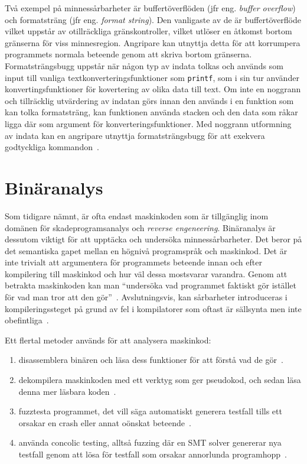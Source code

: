 Två exempel på minnessårbarheter är buffertöverflöden (jfr eng. \emph{buffer
    overflow}) och formatsträng (jfr eng. \emph{format string}). Den
vanligaste av de är buffertöverflöde vilket uppstår av otillräckliga
gränskontroller, vilket utlöser en åtkomst bortom gränserna för viss
minnesregion. Angripare kan utnyttja detta för att korrumpera programmets
normala beteende genom att skriva bortom gränserna. Formatsträngsbugg uppstår
när någon typ av indata tolkas och används som input till vanliga
textkonverteringsfunktioner som \texttt{printf}, som i sin tur använder
konvertingsfunktioner för kovertering av olika data till text. Om inte en
noggrann och tillräcklig utvärdering av indatan görs innan den används i en
funktion som kan tolka formatsträng, kan funktionen använda stacken och den
data som råkar ligga där som argument för konverteringsfunktioner. Med noggrann
utformning av indata kan en angripare utnyttja formatsträngsbugg för att
exekvera godtyckliga kommandon~\cite{computer_security_cs161}.


\section{Binäranalys}
\label{sec:binar_analys}
Som tidigare nämnt, är ofta endast maskinkoden som är tillgänglig inom domänen
för skadeprogramsanalys och \emph{reverse engeneering}. Binäranalys är dessutom
viktigt för att upptäcka och undersöka minnessårbarheter. Det beror på det
semantiska gapet mellan en högnivå programspråk och maskinkod. Det är inte
trivialt att argumentera för programmets beteende innan och efter kompilering
till maskinkod och hur väl dessa mostsvarar varandra. Genom att betrakta
maskinkoden kan man ``undersöka vad programmet faktiskt gör istället för vad
man tror att den gör''~\cite{andriesse2018}. Avslutningsvis, kan sårbarheter
introduceras i kompileringssteget på grund av fel i kompilatorer som oftast är
sällsynta men inte obefintliga~\cite{dusilent}.

Ett flertal metoder används för att analysera maskinkod:
\begin{enumerate}
    \item disassemblera binären och läsa dess funktioner för att förstå vad de gör~\cite{ghidra_website}.
    \item dekompilera maskinkoden med ett verktyg som ger pseudokod, och sedan läsa denna mer
          läsbara koden~\cite{ghidra_website}.
    \item fuzztesta programmet, det vill säga automatiskt generera testfall tills ett orsakar en crash eller
          annat oönskat beteende~\cite{8371326}.
    \item använda concolic testing, alltså fuzzing där en SMT solver genererar nya testfall genom att
          lösa för testfall som orsakar annorlunda programhopp~\cite{sage}.
\end{enumerate}

